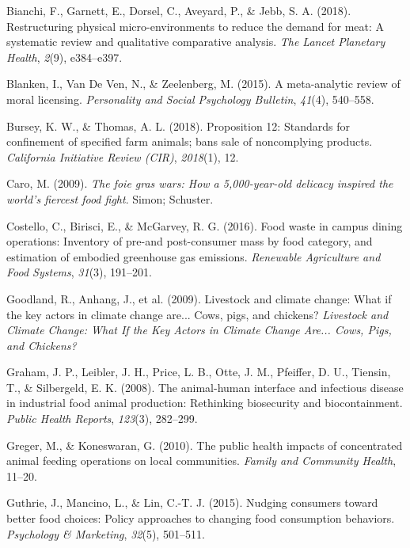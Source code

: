 \documentclass[
  man]{apa6}
\newlength{\cslhangindent}
\newenvironment{CSLReferences}[2] %
 {\begin{list}{}{%
  \setlength{\itemindent}{0pt}
  \setlength{\leftmargin}{0pt}
  \setlength{\parsep}{0pt}
  \ifodd #1
   \setlength{\leftmargin}{\cslhangindent}
   \setlength{\itemindent}{-1\cslhangindent}
  \fi
  \setlength{\itemsep}{#2\baselineskip}}}
 {\end{list}}
\begin{document}
\label{refs}
\begin{CSLReferences}{1}{0}
Bianchi, F., Garnett, E., Dorsel, C., Aveyard, P., \& Jebb, S. A. (2018). Restructuring physical micro-environments to reduce the demand for meat: A systematic review and qualitative comparative analysis. \emph{The Lancet Planetary Health}, \emph{2}(9), e384--e397.

Blanken, I., Van De Ven, N., \& Zeelenberg, M. (2015). A meta-analytic review of moral licensing. \emph{Personality and Social Psychology Bulletin}, \emph{41}(4), 540--558.

Bursey, K. W., \& Thomas, A. L. (2018). Proposition 12: Standards for confinement of specified farm animals; bans sale of noncomplying products. \emph{California Initiative Review (CIR)}, \emph{2018}(1), 12.

Caro, M. (2009). \emph{The foie gras wars: How a 5,000-year-old delicacy inspired the world's fiercest food fight}. Simon; Schuster.

Costello, C., Birisci, E., \& McGarvey, R. G. (2016). Food waste in campus dining operations: Inventory of pre-and post-consumer mass by food category, and estimation of embodied greenhouse gas emissions. \emph{Renewable Agriculture and Food Systems}, \emph{31}(3), 191--201.

Goodland, R., Anhang, J., et al. (2009). Livestock and climate change: What if the key actors in climate change are... Cows, pigs, and chickens? \emph{Livestock and Climate Change: What If the Key Actors in Climate Change Are... Cows, Pigs, and Chickens?}

Graham, J. P., Leibler, J. H., Price, L. B., Otte, J. M., Pfeiffer, D. U., Tiensin, T., \& Silbergeld, E. K. (2008). The animal-human interface and infectious disease in industrial food animal production: Rethinking biosecurity and biocontainment. \emph{Public Health Reports}, \emph{123}(3), 282--299.

Greger, M., \& Koneswaran, G. (2010). The public health impacts of concentrated animal feeding operations on local communities. \emph{Family and Community Health}, 11--20.

Guthrie, J., Mancino, L., \& Lin, C.-T. J. (2015). Nudging consumers toward better food choices: Policy approaches to changing food consumption behaviors. \emph{Psychology \& Marketing}, \emph{32}(5), 501--511.


\end{CSLReferences}
\end{document}
